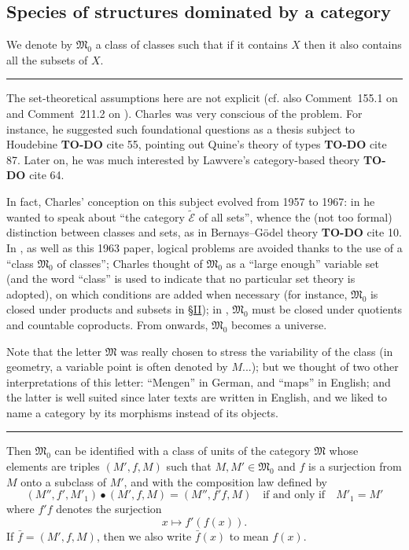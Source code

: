 \documentclass[a4paper,oneside,nobib,nofonts,notitlepage,notoc,nols,fleqn,justified]{tufte-book}
\newenvironment{longcomm}[1]
  {\begin{fullwidth}\bigskip\hrule\phantomsection\par\bigskip\noindent[#1]\rmfamily}
  {\par\bigskip\hrule\bigskip\end{fullwidth}}
\newcommand{\todo}{{\color{purple}\textbf{TO-DO }}}
\newcommand{\MM}{\mathfrak{M}}
\begin{document}
\subsection{Species of structures dominated by a category}
\label{section:i.3}

We denote by $\MM_0$ a class of classes such that if it contains $X$ then it also contains all the subsets of $X$.

\begin{longcomm}{24.1}
  The set-theoretical assumptions here are not explicit (cf. also Comment~155.1 on \cite{66} and Comment~211.2 on \cite{100}).
  Charles was very conscious of the problem.
  For instance, he suggested such foundational questions as a thesis subject to Houdebine \todo{cite 55}, pointing out Quine's theory of types \todo{cite 87}.
  Later on, he was much interested by Lawvere's category-based theory \todo{cite 64}.

  In fact, Charles' conception on this subject evolved from 1957 to 1967: in \cite{47} he wanted to speak about ``the category $\widetilde{\mathcal{E}}$ of all sets'', whence the (not too formal) distinction between classes and sets, as in Bernays--Gödel theory \todo{cite 10}.
  In \cite{55}, as well as this 1963 paper, logical problems are avoided thanks to the use of a ``class $\MM_0$ of classes'';
  Charles thought of $\MM_0$ as a ``large enough'' variable set (and the word ``class'' is used to indicate that no particular set theory is adopted), on which conditions are added when necessary (for instance, $\MM_0$ is closed under products and subsets in \hyperref[section:ii]{§II});
  in \cite{66,100}, $\MM_0$ must be closed under quotients and countable coproducts.
  From \cite{109} onwards, $\MM_0$ becomes a universe.

  Note that the letter $\MM$ was really chosen to stress the variability of the class (in geometry, a variable point is often denoted by $M$...);
  but we thought of two other interpretations of this letter: ``Mengen'' in German, and ``maps'' in English;
  and the latter is well suited since later texts are written in English, and we liked to name a category by its morphisms instead of its objects.
\end{longcomm}

Then $\MM_0$ can be identified with a class of units of the category $\MM$ whose elements are triples $(M',f,M)$ such that $M,M'\in\MM_0$ and $f$ is a surjection from $M$ onto a subclass of $M'$, and with the composition law defined by
\[
  (M'',f',M'_1)\bullet(M',f,M)
  = (M'',f'f,M)
  \quad\text{if and only if}\quad
  M'_1=M'
\]
where $f'f$ denotes the surjection
\[
  x\longmapsto f'(f(x)).
\]
If $\bar{f}=(M',f,M)$, then we also write $\bar{f}(x)$ to mean $f(x)$.
\end{document}

